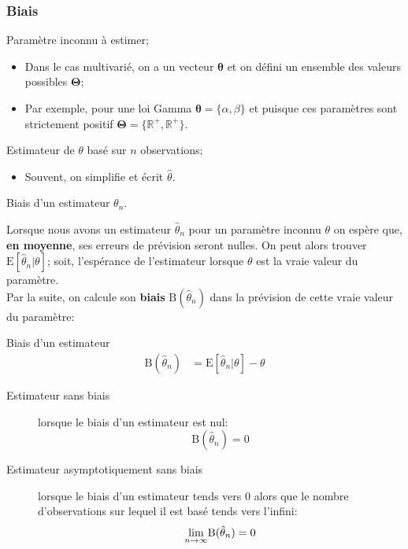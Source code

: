 \documentclass[10pt, french]{article}
\begin{document}
\begin{multicols*}{2}
\subsubsection{Biais}
\begin{distributions}[Notation]
\begin{description}[font = \normalfont]
	\item[$\theta$]	Paramètre inconnu à estimer;
		\begin{itemize}
		\item	Dans le cas multivarié, on a un vecteur $\bm{\theta}$ et on défini un ensemble des valeurs possibles $\bm{\Theta}$;
		\item	Par exemple, pour une loi Gamma $\bm{\theta}	=	\{\alpha, \beta\}$ et puisque ces paramètres sont strictement positif $\bm{\Theta}	=	\{\mathbb{R}^{+}, \mathbb{R}^{+}\}$.
		\end{itemize}
	\item[$\hat{\theta}_{n}$]	Estimateur de $\theta$ basé sur $n$ observations;
		\begin{itemize}[leftmargin = *]
		\item	Souvent, on simplifie et écrit $\hat{\theta}$.
		\end{itemize}
	\item[$\text{B}(\hat{\theta}_{n})$]	Biais d'un estimateur $\theta_{n}$.
\end{description}
\end{distributions}

Lorsque nous avons un estimateur $\hat{\theta}_{n}$ pour un paramètre inconnu $\theta$ on espère que, \textbf{en moyenne}, ses erreurs de prévision seront nulles. 
On peut alors trouver $\text{E}[\hat{\theta}_{n} | \theta]$; soit, l'espérance de l'estimateur lorsque $\theta$ est la vraie valeur du paramètre.	\\
Par la suite, on calcule son \textbf{biais} $\text{B}(\hat{\theta}_{n})$ dans la prévision de cette vraie valeur du paramètre:
\begin{algo}{Biais d'un estimateur}
\begin{align*}
	\text{B}(\hat{\theta}_{n}) 
	&= 	\text{E}[\hat{\theta}_{n} | \theta] - \theta
\end{align*}
\tcbline
\begin{description}
	\item[Estimateur sans biais]	lorsque le biais d'un estimateur est nul:
		 \[
		 	\text{B}(\hat{\theta}_{n}) = 0
		 \]
	\item[Estimateur asymptotiquement sans biais]	lorsque le biais d'un estimateur tends vers 0 alors que le nombre d'observations sur lequel il est basé tends vers l'infini: 
		\[
			\underset{n \rightarrow \infty}{\lim}\text{B}(\hat{\theta}_{n}) = 0
		\]
\end{description}
\end{algo}


\end{multicols*}
\end{document}
